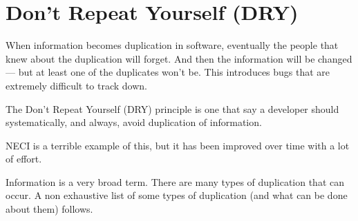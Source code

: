 \documentclass[a4paper,notitlepage,dvipsnames]{scrreprt}
\begin{document}
\section{Don't Repeat Yourself (DRY)}
	When information becomes duplication in software, eventually the people
	that knew about the duplication will forget. And then the information will
	be changed --- but at least one of the duplicates won't be. This introduces
	bugs that are extremely difficult to track down.

	The Don't Repeat Yourself (DRY) principle is one that say a developer
	should systematically, and always, avoid duplication of information.

	NECI is a terrible example of this, but it has been improved over time
	with a lot of effort.

	Information is a very broad term. There are many types of duplication that
	can occur. A non exhaustive list of some types of duplication (and what
	can be done about them) follows.
\end{document}
